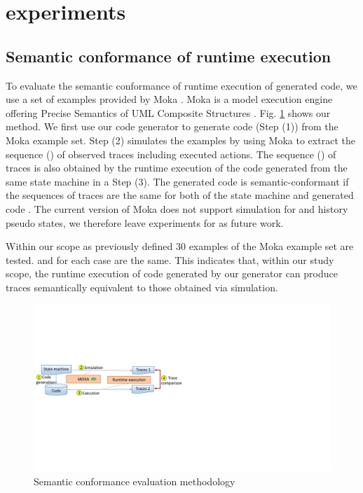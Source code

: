 \section{experiments}
\label{sec:exp}
\subsection{Semantic conformance of runtime execution}
\label{subsec:exp1}
To evaluate the semantic conformance of runtime execution of generated code, we use a set of examples provided by Moka \cite{moka}. Moka is a model execution engine offering Precise Semantics of UML Composite Structures \cite{OMG2015}. Fig. \ref{fig:semanticconformance} shows our method. We first use our code generator to generate code (Step (1)) from the Moka example set. Step (2) simulates the examples by using Moka to extract the sequence () of observed traces including executed actions. The sequence () of traces is also obtained by the runtime execution of the code generated from the same state machine in a Step (3). The generated code is semantic-conformant if the sequences of traces are the same for both of the state machine and generated code \cite{Blech2005}. The current version of Moka does not support simulation for  and history pseudo states, we therefore leave experiments for  as future work.



Within our scope as previously defined 30 examples of the Moka example set are tested.  and  for each case are the same. 
This indicates that, within our study scope, the runtime execution of code generated by our generator can produce traces semantically equivalent to those obtained via simulation. 

\begin{figure}
	\centering
	\includegraphics[clip, trim=0.2cm 8.6cm 19.4cm 6.9cm, width=\columnwidth]{figures/semanticconformance.pdf}
	\caption{Semantic conformance evaluation methodology} 
	\label{fig:semanticconformance}
\end{figure}		

